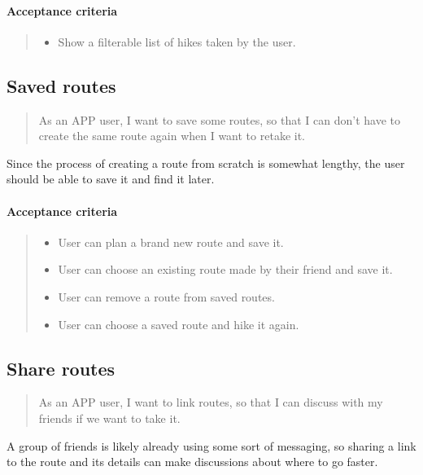 \paragraph*{Acceptance criteria}
\begin{quote}
\begin{itemize}
    \item Show a filterable list of hikes taken by the user.
\end{itemize}
\end{quote}

\subsection{Saved routes}\label{US:map-saved}
\begin{quote}
As an APP user, I want to save some routes, so that I can don't have to create the same route again when I want to retake it.
\end{quote}

Since the process of creating a route from scratch is somewhat lengthy, the user should be able to save it and find it later.

\paragraph*{Acceptance criteria}
\begin{quote}
\begin{itemize}
    \item User can plan a brand new route and save it.
    \item User can choose an existing route made by their friend and save it.
    \item User can remove a route from saved routes.
    \item User can choose a saved route and hike it again.
\end{itemize}
\end{quote}

\subsection{Share routes}\label{US:map-share-route}
\begin{quote}
    As an APP user, I want to link routes, so that I can discuss with my friends if we want to take it.
\end{quote}

A group of friends is likely already using some sort of messaging, so sharing a link to the route and its details can make discussions about where to go faster.


